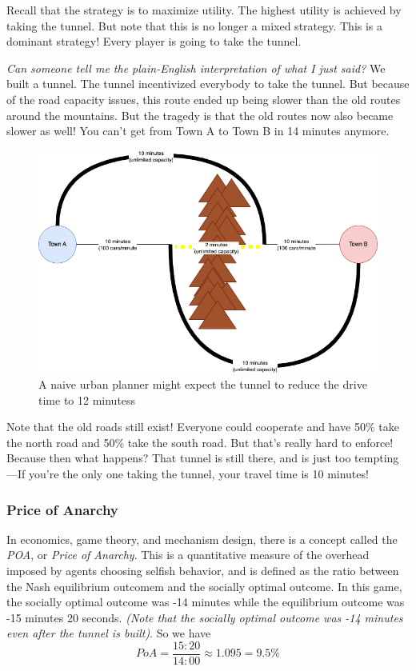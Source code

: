 \documentclass[11pt]{article}
\begin{document}
Recall that the strategy is to maximize utility. The highest utility is achieved by taking the tunnel.
But note that this is no longer a mixed strategy. This is a dominant strategy! Every player is going to take the tunnel.

{\it Can someone tell me the plain-English interpretation of what I just said?} We built a tunnel. The tunnel incentivized everybody to take the tunnel. But because of the road capacity issues, this route ended up being slower than the old routes around the mountains. But the tragedy is that the old routes now also became slower as well! You can't get from Town A to Town B in 14 minutes anymore.  


\begin{figure}
    \centering
    \includegraphics[width=5in]{braess_3.png}
    \caption{A naive urban planner might expect the tunnel to reduce the drive time to 12 minutess}
\end{figure}

Note that the old roads still exist! Everyone could cooperate and have 50\% take the north road and 50\% take the south road. But that's really hard to enforce! 
Because then what happens? 
That tunnel is still there, and is just too tempting---If you're the only one taking the tunnel, your travel time is 10 minutes! 

\subsubsection{Price of Anarchy}

In economics, game theory, and mechanism design, there is a concept called the {\it POA}, or {\it Price of Anarchy}.
This is a quantitative measure of the overhead imposed by agents choosing selfish behavior, and is defined as the ratio between the Nash equilibrium outcomem and the socially optimal outcome. 
In this game, the socially optimal outcome was -14 minutes while the equilibrium outcome was -15 minutes 20 seconds. 
{\it (Note that the socially optimal outcome was -14 minutes even after the tunnel is built)}.
So we have
$$ PoA = \frac{15{:}20}{14{:}00} \approx 1.095 = 9.5\%$$
\end{document}
